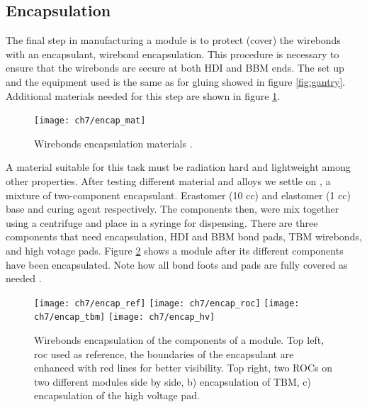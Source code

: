 \subsection{Encapsulation}
The final step in manufacturing a module is to protect (cover) the wirebonds with an encapsulant, wirebond encapsulation. This procedure is necessary to ensure that the wirebonds are secure at both HDI and BBM ends. The set up and the equipment used is the same as for gluing showed in figure \ref{fig:gantry}. Additional materials needed for this step are shown in figure \ref{fig:encapmate}. 
 
\begin{figure}[!h]
	\centering
	\texttt{[image: ch7/encap\_mat]}
	\caption[Encapsulation materials]{Wirebonds encapsulation materials \cite{ph1_sop}.}
	\label{fig:encapmate}
\end{figure}

A material suitable for this task must be radiation hard and lightweight among other properties. After testing different material and alloys we settle on , a mixture of two-component encapsulant. Erastomer (10 cc) and elastomer (1 cc) base and curing agent respectively. The components then, were mix together using a centrifuge and place in a syringe for dispensing. There are three components that need encapsulation, HDI and BBM bond pads, TBM wirebonds, and high votage pads. Figure \ref{fig:encap} shows a module after its different components have been encapsulated. Note how all bond foots and pads are fully covered as needed \cite{and_the}. 

\begin{figure}[!h]
  \centering
  \texttt{[image: ch7/encap\_ref]}
  \texttt{[image: ch7/encap\_roc]}
  \texttt{[image: ch7/encap\_tbm]}
  \texttt{[image: ch7/encap\_hv]}
  \caption[Encapsulation results]{Wirebonds encapsulation of the components of a module. Top left, roc used as reference, the boundaries of the encapsulant are enhanced with red lines for better visibility. Top right, two ROCs on two different modules side by side, b) encapsulation of TBM, c) encapsulation of the high voltage pad.}\label{fig:encap}
\end{figure}

